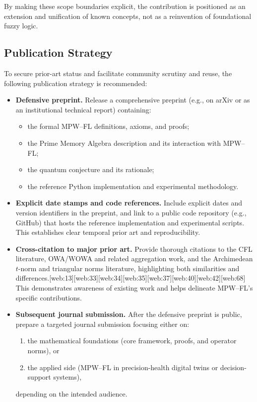 \documentclass[11pt]{article}
\begin{document}
By making these scope boundaries explicit, the contribution is positioned as an extension and unification of known concepts, not as a reinvention of foundational fuzzy logic.

\subsection{Publication Strategy}
\label{subsec:publication-strategy}

To secure prior-art status and facilitate community scrutiny and reuse, the following publication strategy is recommended:

\begin{itemize}
  \item \textbf{Defensive preprint.} Release a comprehensive preprint (e.g., on arXiv or as an institutional technical report) containing:
  \begin{itemize}
    \item the formal MPW--FL definitions, axioms, and proofs;
    \item the Prime Memory Algebra description and its interaction with MPW--FL;
    \item the quantum conjecture and its rationale;
    \item the reference Python implementation and experimental methodology.
  \end{itemize}
  \item \textbf{Explicit date stamps and code references.} Include explicit dates and version identifiers in the preprint, and link to a public code repository (e.g., GitHub) that hosts the reference implementation and experimental scripts. This establishes clear temporal prior art and reproducibility.
  \item \textbf{Cross-citation to major prior art.} Provide thorough citations to the CFL literature, OWA/WOWA and related aggregation work, and the Archimedean $t$-norm and triangular norms literature, highlighting both similarities and differences.[web:13][web:33][web:34][web:35][web:37][web:40][web:42][web:68] This demonstrates awareness of existing work and helps delineate MPW--FL’s specific contributions.
  \item \textbf{Subsequent journal submission.} After the defensive preprint is public, prepare a targeted journal submission focusing either on:
  \begin{enumerate}
    \item the mathematical foundations (core framework, proofs, and operator norms), or
    \item the applied side (MPW--FL in precision-health digital twins or decision-support systems),
  \end{enumerate}
  depending on the intended audience.
\end{itemize}
\end{document}
